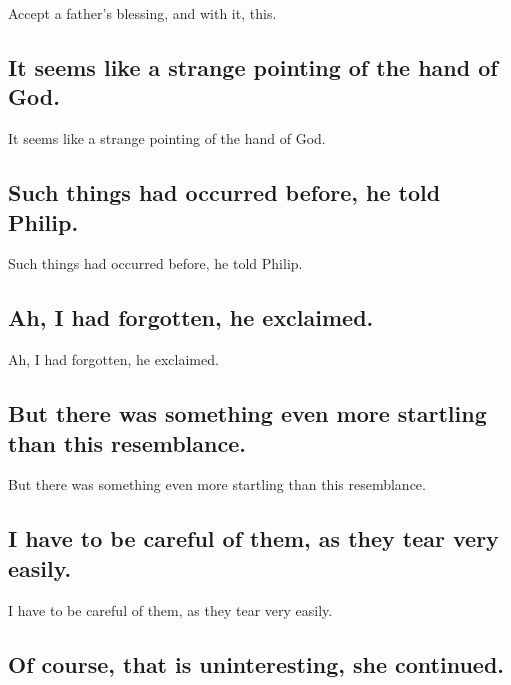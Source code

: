 \documentclass[]{article}
\begin{document}
Accept a father's blessing, and with it, this.

\hypertarget{it-seems-like-a-strange-pointing-of-the-hand-of-god.}{%
\subsection{It seems like a strange pointing of the hand of
God.}\label{it-seems-like-a-strange-pointing-of-the-hand-of-god.}}

It seems like a strange pointing of the hand of God.

\hypertarget{such-things-had-occurred-before-he-told-philip.}{%
\subsection{Such things had occurred before, he told
Philip.}\label{such-things-had-occurred-before-he-told-philip.}}

Such things had occurred before, he told Philip.

\hypertarget{ah-i-had-forgotten-he-exclaimed.}{%
\subsection{Ah, I had forgotten, he
exclaimed.}\label{ah-i-had-forgotten-he-exclaimed.}}

Ah, I had forgotten, he exclaimed.

\hypertarget{but-there-was-something-even-more-startling-than-this-resemblance.}{%
\subsection{But there was something even more startling than this
resemblance.}\label{but-there-was-something-even-more-startling-than-this-resemblance.}}

But there was something even more startling than this resemblance.

\hypertarget{i-have-to-be-careful-of-them-as-they-tear-very-easily.}{%
\subsection{I have to be careful of them, as they tear very
easily.}\label{i-have-to-be-careful-of-them-as-they-tear-very-easily.}}

I have to be careful of them, as they tear very easily.

\hypertarget{of-course-that-is-uninteresting-she-continued.}{%
\subsection{Of course, that is uninteresting, she
continued.}\label{of-course-that-is-uninteresting-she-continued.}}
\end{document}
